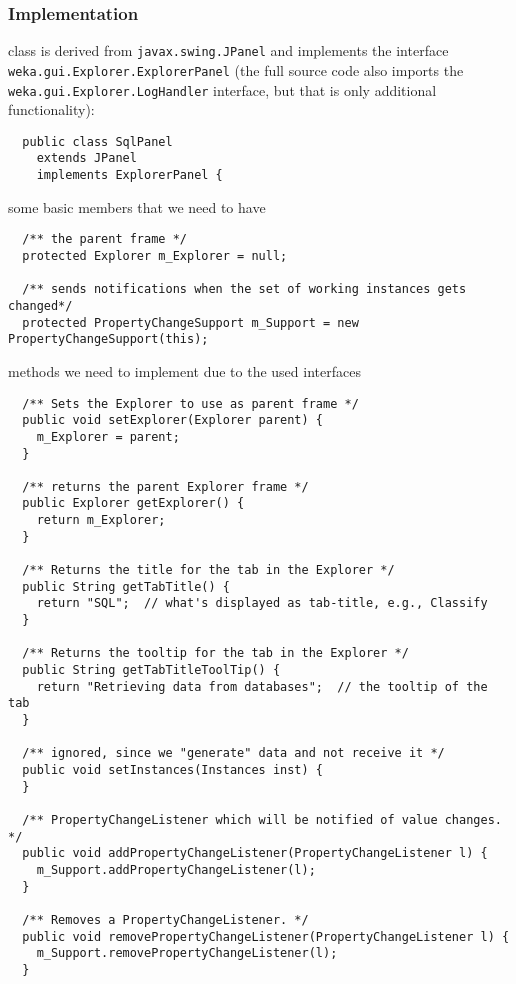 \subsubsection*{Implementation}
\begin{tight_itemize}
  \item class is derived from \texttt{javax.swing.JPanel} and implements the
interface \texttt{weka.gui.Explorer.ExplorerPanel} (the full source code also
imports the \texttt{weka.gui.Explorer.LogHandler} interface, but that is only
additional functionality):
  \begin{verbatim}
  public class SqlPanel
    extends JPanel
    implements ExplorerPanel {
  \end{verbatim}

  \item some basic members that we need to have
  \begin{verbatim}
  /** the parent frame */
  protected Explorer m_Explorer = null;

  /** sends notifications when the set of working instances gets changed*/
  protected PropertyChangeSupport m_Support = new PropertyChangeSupport(this);
  \end{verbatim}

  \item methods we need to implement due to the used interfaces
  \begin{verbatim}
  /** Sets the Explorer to use as parent frame */
  public void setExplorer(Explorer parent) {
    m_Explorer = parent;
  }

  /** returns the parent Explorer frame */
  public Explorer getExplorer() {
    return m_Explorer;
  }

  /** Returns the title for the tab in the Explorer */
  public String getTabTitle() {
    return "SQL";  // what's displayed as tab-title, e.g., Classify
  }

  /** Returns the tooltip for the tab in the Explorer */
  public String getTabTitleToolTip() {
    return "Retrieving data from databases";  // the tooltip of the tab
  }

  /** ignored, since we "generate" data and not receive it */
  public void setInstances(Instances inst) {
  }

  /** PropertyChangeListener which will be notified of value changes. */
  public void addPropertyChangeListener(PropertyChangeListener l) {
    m_Support.addPropertyChangeListener(l);
  }

  /** Removes a PropertyChangeListener. */
  public void removePropertyChangeListener(PropertyChangeListener l) {
    m_Support.removePropertyChangeListener(l);
  }
  \end{verbatim}


\end{tight_itemize}
